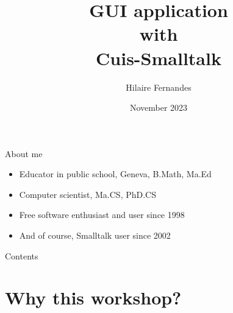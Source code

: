 \documentclass{beamer}
\title{GUI application\\ with\\ Cuis-Smalltalk}
\author{Hilaire Fernandes}
\institute[DIP, Geneva]{Department of Public Instruction \\ Geneva}
\date{November 2023}
\begin{document}
\begin{frame}
  \titlepage
\end{frame}
%
\begin{frame}{About me}
  \fontsize{12pt}{30pt}\selectfont
  \begin{itemize}
  \item Educator in public school, Geneva, B.Math, Ma.Ed
  \item Computer scientist, Ma.CS, PhD.CS
  \item Free software enthusiast and user since 1998
  \item And of course, Smalltalk user since 2002
  \end{itemize}
\end{frame}
%
\begin{frame}{Contents}
  \tableofcontents[hideallsubsections]
\end{frame}

\section{Why this workshop?}
\end{document}
